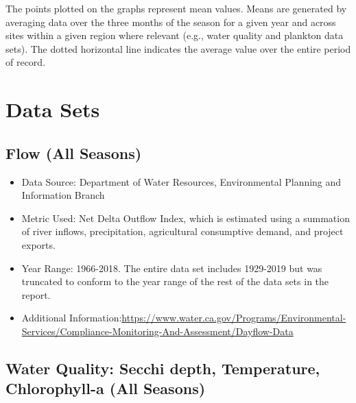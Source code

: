 \documentclass[
]{book}
\providecommand{\tightlist}{%
  \setlength{\itemsep}{0pt}\setlength{\parskip}{0pt}}
\begin{document}
The points plotted on the graphs represent mean values. Means are generated by averaging data over the three months of the season for a given year and across sites within a given region where relevant (e.g., water quality and plankton data sets). The dotted horizontal line indicates the average value over the entire period of record.

\hypertarget{data-sets}{%
\section{Data Sets}\label{data-sets}}

\hypertarget{flow-all-seasons}{%
\subsection{Flow (All Seasons)}\label{flow-all-seasons}}

\begin{itemize}
\tightlist
\item
  Data Source: Department of Water Resources, Environmental Planning and Information Branch
\item
  Metric Used: Net Delta Outflow Index, which is estimated using a summation of river inflows, precipitation, agricultural consumptive demand, and project exports.
\item
  Year Range: 1966-2018. The entire data set includes 1929-2019 but was truncated to conform to the year range of the rest of the data sets in the report.
\item
  Additional Information:\url{https://www.water.ca.gov/Programs/Environmental-Services/Compliance-Monitoring-And-Assessment/Dayflow-Data}
\end{itemize}

\hypertarget{water-quality-secchi-depth-temperature-chlorophyll-a-all-seasons}{%
\subsection{Water Quality: Secchi depth, Temperature, Chlorophyll-a (All Seasons)}\label{water-quality-secchi-depth-temperature-chlorophyll-a-all-seasons}}
\end{document}
